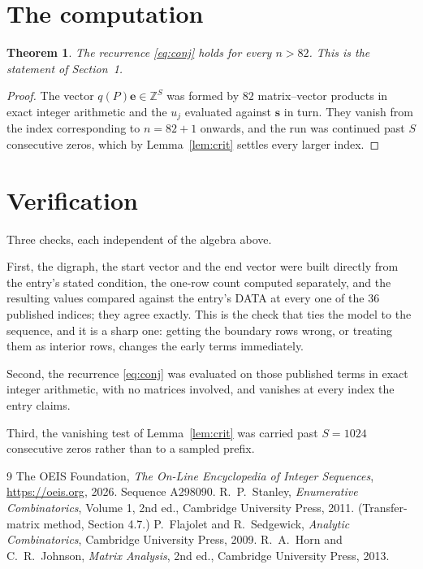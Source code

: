 \documentclass[11pt,a4paper]{article}
\theoremstyle{plain}
\newtheorem{theorem}{Theorem}
\theoremstyle{definition}
\begin{document}
\section{The computation}

\begin{theorem}
The recurrence \eqref{eq:conj} holds for every $n>82$. This is the statement of
Section~1.
\end{theorem}

\begin{proof}
The vector $q(P)\mathbf{e}\in\mathbb{Z}^{S}$ was formed by $82$ matrix--vector
products in exact integer arithmetic and the $u_j$ evaluated against $\mathbf{s}$ in turn.
They vanish from the index corresponding to $n=82+1$ onwards, and the run was continued
past $S$ consecutive zeros, which by Lemma~\ref{lem:crit} settles every larger index.
\end{proof}

\section{Verification}

Three checks, each independent of the algebra above.

First, the digraph, the start vector and the end vector were built directly from the
entry's stated condition, the one-row count computed separately, and the resulting values
compared against the entry's DATA at every one of the $36$ published indices; they
agree exactly. This is the check that ties the model to the sequence, and it is a sharp one:
getting the boundary rows wrong, or treating them as interior rows, changes the early terms
immediately.

Second, the recurrence \eqref{eq:conj} was evaluated on those published terms in exact
integer arithmetic, with no matrices involved, and vanishes at every index the entry claims.

Third, the vanishing test of Lemma~\ref{lem:crit} was carried past $S=1024$ consecutive
zeros rather than to a sampled prefix.

\begin{thebibliography}{9}
 The OEIS Foundation, \emph{The On-Line Encyclopedia of Integer
Sequences}, \url{https://oeis.org}, 2026. Sequence A298090.
 R.~P.~Stanley, \emph{Enumerative Combinatorics}, Volume 1, 2nd ed.,
Cambridge University Press, 2011. (Transfer-matrix method, Section 4.7.)
 P.~Flajolet and R.~Sedgewick, \emph{Analytic Combinatorics}, Cambridge
University Press, 2009.
 R.~A.~Horn and C.~R.~Johnson, \emph{Matrix Analysis}, 2nd ed., Cambridge
University Press, 2013.
\end{thebibliography}
\end{document}
